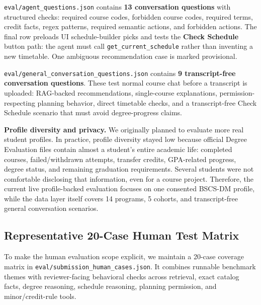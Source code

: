 \documentclass[10pt,letterpaper]{article}
\newcommand{\code}[1]{\texttt{#1}}
\begin{document}
\code{eval/agent\_questions.json} contains \textbf{13 conversation questions} with structured checks: required course codes, forbidden course codes, required terms, credit facts, regex patterns, required semantic actions, and forbidden actions. The final row preloads UI schedule-builder picks and tests the \textbf{Check Schedule} button path: the agent must call \code{get\_current\_schedule} rather than inventing a new timetable. One ambiguous recommendation case is marked provisional.

\code{eval/general\_conversation\_questions.json} contains \textbf{9 transcript-free conversation questions}. These test normal course chat before a transcript is uploaded: RAG-backed recommendations, single-course explanations, permission-respecting planning behavior, direct timetable checks, and a transcript-free Check Schedule scenario that must avoid degree-progress claims.

\textbf{Profile diversity and privacy.} We originally planned to evaluate more real student profiles. In practice, profile diversity stayed low because official Degree Evaluation files contain almost a student's entire academic life: completed courses, failed/withdrawn attempts, transfer credits, GPA-related progress, degree status, and remaining graduation requirements. Several students were not comfortable disclosing that information, even for a course project. Therefore, the current live profile-backed evaluation focuses on one consented BSCS-DM profile, while the data layer itself covers 14 programs, 5 cohorts, and transcript-free general conversation scenarios.

\subsection{Representative 20-Case Human Test Matrix}
To make the human evaluation scope explicit, we maintain a 20-case coverage matrix in \code{eval/submission\_human\_cases.json}. It combines runnable benchmark themes with reviewer-facing behavioral checks across retrieval, exact catalog facts, degree reasoning, schedule reasoning, planning permission, and minor/credit-rule tools.
\end{document}
